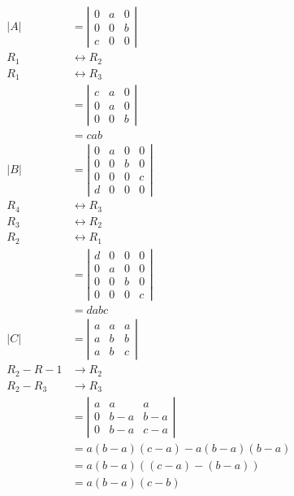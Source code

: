 \documentclass[main.tex]{subfiles}
\begin{document}
\begin{enumerate}
    $$
    \begin{aligned}
    |A|&=\left|\begin{array}{lll}
    0 & a & 0 \\
    0 & 0 & b \\
    c & 0 & 0
    \end{array}\right|&\\
    R_1 &\leftrightarrow R_2 \\
    R_1 &\leftrightarrow R_3 \\
    &=\left|\begin{array}{lll}
    c & a & 0 \\
    0 & a & 0 \\
    0 & 0 & b
    \end{array}\right|\\
    & = cab\\
    |B| & =\left|\begin{array}{llll}
    0 & a & 0 & 0 \\
    0 & 0 & b & 0 \\
    0 & 0 & 0 & c \\
    d & 0 & 0 & 0
    \end{array}\right|\\
    R_4 &\leftrightarrow R_3 \\
    R_3 &\leftrightarrow R_2 \\
    R_2 &\leftrightarrow R_1 \\
    & =\left|\begin{array}{llll}
    d & 0 & 0 & 0 \\
    0 & a & 0 & 0 \\
    0 & 0 & b & 0 \\
    0 & 0 & 0 & c
    \end{array}\right|\\
    & = dabc\\
    |C|&=\left|\begin{array}{lll}
    a & a & a \\
    a & b & b \\
    a & b & c
    \end{array}\right|\\
    R_2 - R-1 &\rightarrow R_2 \\
    R_2 - R_3 &\rightarrow R_3 \\
    &=\left|\begin{array}{ccc}
    a & a & a \\
    0 & b-a & b-a \\
    0 & b-a & c-a
    \end{array}\right|\\
    &=a(b-a)(c-a)-a(b-a)(b-a) \\
    &=a(b-a)((c-a)-(b-a)) \\
    &=a(b-a)(c-b)
    \end{aligned}
    $$
    
\end{enumerate}
\end{document}
